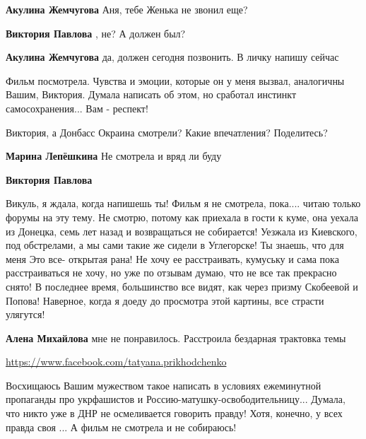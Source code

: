 \begin{itemize}
\begin{itemize}
\textbf{Акулина Жемчугова} Аня, тебе Женька не звонил еще?

\textbf{Виктория Павлова} , не? А должен был?

\textbf{Акулина Жемчугова} да, должен сегодня позвонить. В личку напишу сейчас
\end{itemize} %


Фильм посмотрела. Чувства и эмоции, которые он у меня вызвал, аналогичны Вашим,
Виктория. Думала написать об этом, но сработал инстинкт самосохранения... Вам -
респект!



Виктория, а Донбасс Окраина смотрели? Какие впечатления? Поделитесь?

\begin{itemize} %
\textbf{Марина Лепёшкина} Не смотрела и вряд ли буду

\textbf{Виктория Павлова} 

Викуль, я ждала, когда напишешь ты! Фильм я не смотрела, пока.... читаю только
форумы на эту тему. Не смотрю, потому как приехала в гости к куме, она уехала из
Донецка, семь лет назад и возвращаться не собирается! Уезжала из Киевского, под
обстрелами, а мы сами такие же сидели в Углегорске! Ты знаешь, что для меня Это
все- открытая рана! Не хочу ее расстраивать, кумуську и сама пока
расстраиваться не хочу, но уже по отзывам думаю, что не все так прекрасно снято!
В последнее время, большинство все видят, как через призму Скобеевой и Попова!
Наверное, когда я доеду до просмотра этой картины, все страсти улягутся!


\textbf{Алена Михайлова} мне не понравилось. Расстроила бездарная трактовка темы

\url{https://www.facebook.com/tatyana.prikhodchenko}\par

Восхищаюсь Вашим мужеством такое написать в условиях ежеминутной пропаганды про
укрфашистов и Россию-матушку-освободительницу... Думала, что никто уже в ДНР не
осмеливается говорить правду! Хотя, конечно, у всех правда своя ... А фильм не
смотрела и не собираюсь!


\end{itemize}
\end{itemize}

